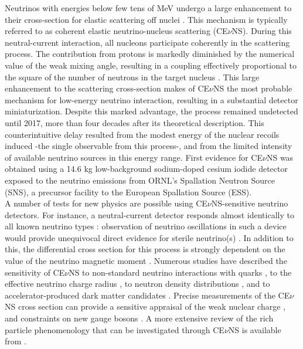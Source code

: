 Neutrinos with energies below few tens of MeV  undergo a large enhancement to their cross-section for  elastic scattering off nuclei \cite{freedman,leo}. This mechanism is typically referred to as coherent elastic neutrino-nucleus scattering (CE$\nu$NS). During this neutral-current interaction, all nucleons participate coherently in the scattering process. The contribution from protons is markedly diminished by the numerical value of the weak mixing angle, resulting in a coupling effectively proportional to the square of the number of neutrons in the target nucleus \cite{leo}. This large enhancement to the scattering cross-section makes of CE$\nu$NS the  most probable mechanism for low-energy neutrino interaction, resulting in a substantial  detector miniaturization. Despite this marked advantage, the process remained undetected until 2017, more than four decades after its theoretical description. This counterintuitive delay resulted from the modest energy of the nuclear recoils induced -the single observable from this process-, and from the limited intensity of available neutrino sources in this energy range. First  evidence for CE$\nu$NS \cite{science,bjorn} was obtained using a 14.6 kg low-background sodium-doped cesium iodide detector \cite{ournim} exposed to the neutrino emissions from ORNL's Spallation Neutron Source (SNS), a precursor facility to the European Spallation Source (ESS). \\

 A number of tests for new physics are possible using CE$\nu$NS-sensitive neutrino detectors. For instance, a neutral-current detector responds almost identically to all known neutrino types \cite{diff}: observation of neutrino oscillations in such a device 
would provide unequivocal direct evidence for sterile neutrino(s) \cite{leo}. In addition to this, the differential cross section for this process is strongly dependent on the value of the neutrino magnetic moment \cite{dodd}. Numerous  studies have described the sensitivity of CE$\nu$NS to non-standard neutrino interactions with quarks \cite{Barranco:2005yy,new2}, to the effective neutrino charge radius \cite{Bernabeu:2002pd}, to neutron density distributions  \cite{patton,patton2,nst1}, and to accelerator-produced dark matter candidates \cite{tayloe2}. Precise measurements of the CE$\nu$NS cross section can provide a sensitive appraisal of the weak nuclear charge \cite{larry}, and constraints on new gauge bosons \cite{shoemaker}. A more extensive review of the rich particle phenomenology that can be investigated through CE$\nu$NS is available from  \cite{ESS}.\\


